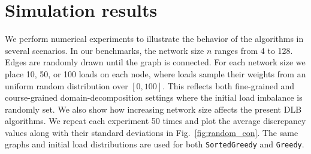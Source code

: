 \documentclass[12pt,psfig,a4]{article}
\newcommand{\sg}{\texttt{SortedGreedy}}
\newcommand{\gr}{\texttt{Greedy}}
\theoremstyle{plain}
\begin{document}
\section{Simulation results}
\label{sec:sims}
We perform numerical experiments to illustrate the behavior of the algorithms in several scenarios. In our benchmarks, the network size $n$ ranges from 4 to 128. Edges are randomly drawn until the graph is connected. For each network size we place 10, 50, or 100 loads on each node, where loads sample their weights from an uniform random distribution over $[0,100]$. This reflects both fine-grained and course-grained domain-decomposition settings where the initial load imbalance is randomly set. We also show how increasing network size affects the present DLB algorithms. We repeat each experiment 50 times and plot the average discrepancy values along with their standard deviations in Fig.~\ref{fig:random_con}. The same graphs and initial load distributions are used for both \sg{} and \gr{}.
\end{document}
